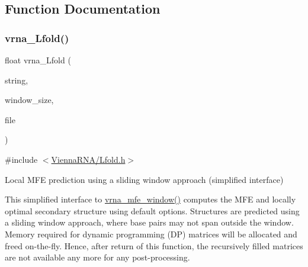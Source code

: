 \subsection{Function Documentation}
\mbox{\label{group__local__mfe__fold_ga4918cce52bf69c1913cda503b2ac75d8}} 
\subsubsection{\texorpdfstring{vrna\+\_\+\+Lfold()}{vrna\_Lfold()}}
{\footnotesize\ttfamily float vrna\+\_\+\+Lfold (\begin{DoxyParamCaption}\item[{const char $\ast$}]{string,  }\item[{int}]{window\+\_\+size,  }\item[{F\+I\+LE $\ast$}]{file }\end{DoxyParamCaption})}



{\ttfamily \#include $<$\mbox{\hyperlink{_lfold_8h}{Vienna\+R\+N\+A/\+Lfold.\+h}}$>$}



Local M\+FE prediction using a sliding window approach (simplified interface) 

This simplified interface to \mbox{\hyperlink{group__local__mfe__fold_ga689df235a1915a1ad56e377383c044ce}{vrna\+\_\+mfe\+\_\+window()}} computes the M\+FE and locally optimal secondary structure using default options. Structures are predicted using a sliding window approach, where base pairs may not span outside the window. Memory required for dynamic programming (DP) matrices will be allocated and free\textquotesingle{}d on-\/the-\/fly. Hence, after return of this function, the recursively filled matrices are not available any more for any post-\/processing.


